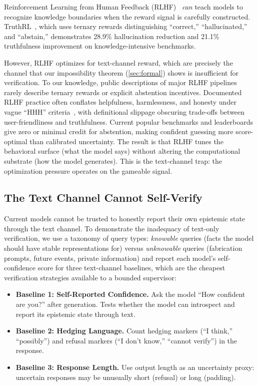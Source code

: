 Reinforcement Learning from Human Feedback
(RLHF)~\cite{ouyang2022instructgpt} \emph{can} teach models to recognize
knowledge boundaries when the reward signal is carefully constructed.
TruthRL~\cite{truthrl}, which uses ternary rewards distinguishing ``correct,''
``hallucinated,'' and ``abstain,'' demonstrates 28.9\% hallucination reduction
and 21.1\% truthfulness improvement on knowledge-intensive benchmarks.

However, RLHF optimizes for text-channel reward, which are precisely the channel that
our impossibility theorem (\autoref{sec:formal}) shows is insufficient for
verification. To our knowledge, public descriptions of major RLHF pipelines rarely describe
ternary rewards or explicit abstention incentives. Documented RLHF practice often conflates
helpfulness, harmlessness, and honesty under vague ``HHH'' criteria~\cite{askell2021general}, with
definitional slippage obscuring trade-offs between user-friendliness and
truthfulness. Current popular benchmarks and leaderboards give zero or minimal
credit for abstention, making confident guessing more score-optimal than
calibrated uncertainty. The result is that RLHF tunes the behavioral surface
(what the model says) without altering the computational substrate (how the
model generates). This is the text-channel trap: the optimization pressure
operates on the gameable signal.


\subsection{The Text Channel Cannot Self-Verify}
\label{sec:bg_eval}

Current models cannot
be trusted to honestly report their own epistemic state through the text channel.
To demonstrate the inadequacy of text-only verification, we use a taxonomy of
query types: \emph{knowable} queries (facts the model should have stable
representations for) versus \emph{unknowable} queries (fabrication prompts,
future events, private information) and report each model's self-confidence
score for three text-channel baselines, which are the cheapest verification strategies
available to a bounded supervisor:

\begin{itemize}
    \item \textbf{Baseline 1: Self-Reported Confidence.} Ask the model
    ``How confident are you?'' after generation. Tests whether the
    model can introspect and report its epistemic state through text.
    \item \textbf{Baseline 2: Hedging Language.} Count hedging markers
    (``I think,'' ``possibly'') and refusal markers (``I don't know,''
    ``cannot verify'') in the response.
    \item \textbf{Baseline 3: Response Length.} Use output length as an
    uncertainty proxy: uncertain responses may be unusually short
    (refusal) or long (padding).
\end{itemize}

